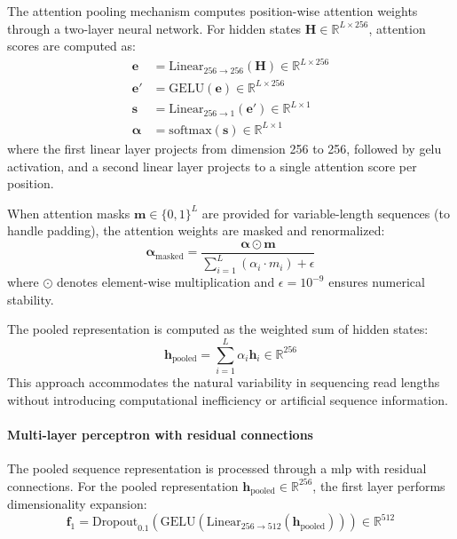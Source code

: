 \documentclass[pdflatex,sn-nature]{sn-jnl}%
\theoremstyle{thmstyleone}%
\theoremstyle{thmstyletwo}%
\theoremstyle{thmstylethree}%
\begin{document}
The attention pooling mechanism computes position-wise attention weights through a two-layer neural network.
For hidden states $\mathbf{H} \in \mathbb{R}^{L \times 256}$, attention scores are computed as:
\begin{align*}
	\mathbf{e}          & = \text{Linear}_{256 \to 256}(\mathbf{H}) \in \mathbb{R}^{L \times 256} \\
	\mathbf{e}'         & = \text{GELU}(\mathbf{e}) \in \mathbb{R}^{L \times 256}                 \\
	\mathbf{s}          & = \text{Linear}_{256 \to 1}(\mathbf{e}') \in \mathbb{R}^{L \times 1}    \\
	\boldsymbol{\alpha} & = \text{softmax}(\mathbf{s}) \in \mathbb{R}^{L \times 1}
\end{align*}
where the first linear layer projects from dimension 256 to 256, followed by \gls{gelu} activation, and a second linear layer projects to a single attention score per position.

When attention masks $\mathbf{m} \in \{0,1\}^L$ are provided for variable-length sequences (to handle padding), the attention weights are masked and renormalized:
$$
	\boldsymbol{\alpha}_{\text{masked}} = \frac{\boldsymbol{\alpha} \odot \mathbf{m}}{\sum_{i=1}^{L} (\alpha_i \cdot m_i) + \epsilon}
$$
where $\odot$ denotes element-wise multiplication and $\epsilon = 10^{-9}$ ensures numerical stability.

The pooled representation is computed as the weighted sum of hidden states:
$$
	\mathbf{h}_{\text{pooled}} = \sum_{i=1}^{L} \alpha_i \mathbf{h}_i \in \mathbb{R}^{256}
$$
This approach accommodates the natural variability in sequencing read lengths without introducing computational inefficiency or artificial sequence information.

\paragraph{Multi-layer perceptron with residual connections}
The pooled sequence representation is processed through a \gls{mlp} with residual connections.
For the pooled representation $\mathbf{h}_{\text{pooled}} \in \mathbb{R}^{256}$, the first layer performs dimensionality expansion:
$$
	\mathbf{f}_1 = \text{Dropout}_{0.1}(\text{GELU}(\text{Linear}_{256 \to 512}(\mathbf{h}_{\text{pooled}}))) \in \mathbb{R}^{512}
$$
\end{document}
